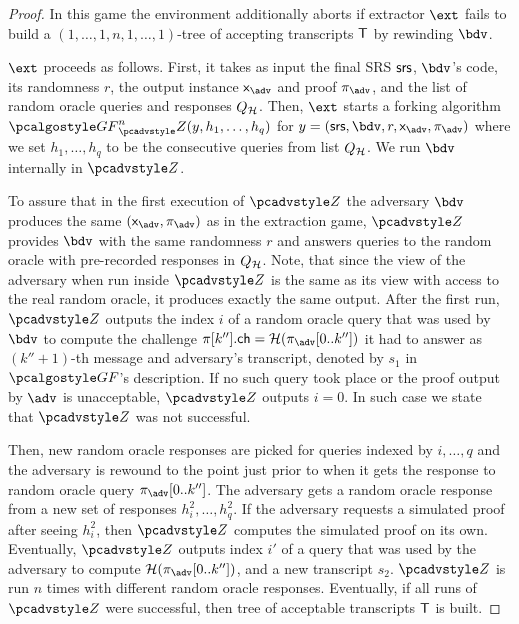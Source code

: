 \begin{proof}
In this game the environment additionally aborts if extractor $\ext$ fails to build a
$(1, \ldots, 1, n, 1, \ldots, 1)$-tree of accepting transcripts $\mathsf{T}$ by rewinding
$\bdv$.

$\ext$ proceeds as follows. First, it takes as input the final SRS $\mathsf{srs}$,
$\bdv$'s code, its randomness $r$, the output instance $\inp_{\advse}$ and proof
$\zkproof_{\advse}$, and the list of random oracle queries and responses
$Q_{\mathcal{H}}$. Then, $\ext$ starts a forking algorithm
$\genforking^{n}_\zdv(y,h_1, \ldots, h_q)$ for
$y = (\srs, \bdv, r, \inp_{\advse}, \zkproof_{\advse})$ where we set
$h_1, \ldots, h_q$ to be the consecutive queries from list $Q_{\mathcal{H}}$. We run $\bdv$
internally in $\zdv$. 
		
To assure that in the first execution of $\zdv$ the adversary $\bdv$ produces the
same $(\inp_{\advse}, \zkproof_{\advse})$ as in the extraction game, $\zdv$ provides
$\bdv$ with the same randomness $r$ and answers queries to the random oracle with
pre-recorded responses in $Q_{\mathcal{H}}$.
Note, that since the view of the adversary when run inside $\zdv$ is the same as its
view with access to the real random oracle, it produces exactly the same
output. After the first run, $\zdv$ outputs the index $i$ of a random oracle query
that was used by $\bdv$ to compute the challenge
$\zkproof[k''].\ch = \ro(\zkproof_{\advse}[0..k''])$ it had to answer as
$(k'' + 1)$-th message and adversary's transcript, denoted by $s_1$ in
$\genforking$'s description. If no such query took place or the proof output by
$\advse$ is unacceptable, $\zdv$ outputs $i = 0$. In such case we state that $\zdv$
was not successful.
		
Then, new random oracle responses are picked for queries indexed by $i, \ldots, q$
and the adversary is rewound to the point just prior to when it gets the response to
random oracle query $\zkproof_{\advse}[0..k'']$. The adversary gets a random oracle response from
a new set of responses $h^2_i, \ldots, h^2_q$. If the adversary requests a simulated
proof after seeing $h^2_i$, then $\zdv$ computes the simulated proof on its
own. Eventually, $\zdv$ outputs index $i'$ of a query that was used by the adversary
to compute $\ro(\zkproof_{\advse}[0..k''])$, and a new transcript $s_2$. $\zdv$ is run
$n$ times with different random oracle responses.  Eventually, if all runs of $\zdv$
were successful, then tree of acceptable transcripts $\mathsf{T}$ is built.
		

\end{proof}
